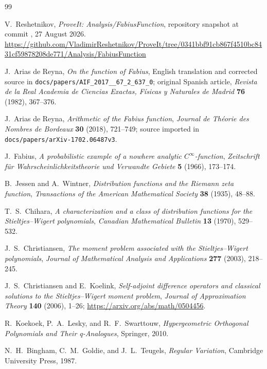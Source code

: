 \documentclass[11pt,oneside]{article}
\theoremstyle{definition}
\theoremstyle{remark}
\begin{document}
\begin{thebibliography}{99}

V.~Reshetnikov,
\emph{ProveIt: Analysis/FabiusFunction}, repository snapshot at commit
\RepoCommit, 27 August 2026.
\url{https://github.com/VladimirReshetnikov/ProveIt/tree/0341bbf91cb867f4510bc8431cf59878208de771/Analysis/FabiusFunction}

J.~Arias de Reyna,
\emph{On the function of Fabius},
English translation and corrected source in
\texttt{docs/papers/AIF\_2017\_\_67\_2\_637\_0}; original Spanish article,
\emph{Revista de la Real Academia de Ciencias Exactas, F\'isicas y Naturales de Madrid}
\textbf{76} (1982), 367--376.

J.~Arias de Reyna,
\emph{Arithmetic of the Fabius function},
\emph{Journal de Th\'eorie des Nombres de Bordeaux} \textbf{30} (2018), 721--749;
source imported in \texttt{docs/papers/arXiv-1702.06487v3}.

J.~Fabius,
\emph{A probabilistic example of a nowhere analytic $C^\infty$-function},
\emph{Zeitschrift f\"ur Wahrscheinlichkeitstheorie und Verwandte Gebiete}
\textbf{5} (1966), 173--174.

B.~Jessen and A.~Wintner,
\emph{Distribution functions and the Riemann zeta function},
\emph{Transactions of the American Mathematical Society} \textbf{38} (1935), 48--88.

T.~S.~Chihara,
\emph{A characterization and a class of distribution functions for the
Stieltjes--Wigert polynomials},
\emph{Canadian Mathematical Bulletin} \textbf{13} (1970), 529--532.

J.~S.~Christiansen,
\emph{The moment problem associated with the Stieltjes--Wigert polynomials},
\emph{Journal of Mathematical Analysis and Applications} \textbf{277} (2003), 218--245.

J.~S.~Christiansen and E.~Koelink,
\emph{Self-adjoint difference operators and classical solutions to the
Stieltjes--Wigert moment problem},
\emph{Journal of Approximation Theory} \textbf{140} (2006), 1--26;
\url{https://arxiv.org/abs/math/0504456}.

R.~Koekoek, P.~A.~Lesky, and R.~F.~Swarttouw,
\emph{Hypergeometric Orthogonal Polynomials and Their q-Analogues},
Springer, 2010.

N.~H.~Bingham, C.~M.~Goldie, and J.~L.~Teugels,
\emph{Regular Variation},
Cambridge University Press, 1987.


\end{thebibliography}
\end{document}
